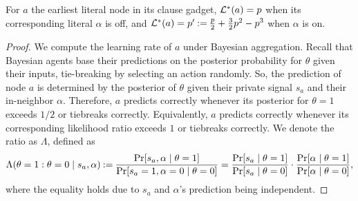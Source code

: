 \begin{lemma}\label{lemma:bayesian_l1_LR}
    For $a$ the earliest literal node in its clause gadget, $\mathcal{L}^*(a) = p$ when its corresponding literal $\alpha$ is off, and $\mathcal{L}^*(a) = p' \mathbin{:=} \frac p2 + \frac 32 p^2 - p^3$ when $\alpha$ is on. 
\end{lemma}
\begin{proof}
    We compute the learning rate of $ a $ under Bayesian aggregation.
    Recall that Bayesian agents base their predictions on the posterior probability for $\theta$ given their inputs, tie-breaking by selecting an action randomly.
    So, the prediction of node $a$ is determined by the posterior of $\theta$ given their private signal $s_a$ and their in-neighbor $\alpha$.
    Therefore, $a$ predicts correctly whenever its posterior for $\theta = 1$ exceeds $1/2$ or tiebreaks correctly.
    Equivalently, $a$ predicts correctly whenever its corresponding likelihood ratio exceeds $1$ or tiebreaks correctly.
    We denote the ratio as $ \Lambda $, defined as
    \[
        \Lambda(\theta = 1 : \theta = 0 \mid s_a, \alpha) \mathbin{:=} \frac {\Pr[s_a, \alpha \mid \theta = 1]} {\Pr[s_a = 1, \alpha = 0 \mid \theta = 0]}                                                            = \frac {\Pr[s_a \mid \theta = 1]} {\Pr[s_a \mid \theta = 0]} \cdot \frac {\Pr[ \alpha \mid \theta = 1]} {\Pr[\alpha \mid \theta = 0]},
    \]
    where the equality holds due to $ s_a $ and $ \alpha $'s prediction being independent.


\end{proof}
